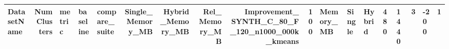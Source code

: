 \begin{tabular}{lrlllrrrrr}
\toprule
DatasetName & NumClusters & metric & baseline & compare_suite & Single_Memory_MB & Hybrid_Memory_MB & Rel_Memory_MB & Improvement_%
\midrule
SYNTH_C_80_F_120_n1000_000k_kmeans & 100 & Memory_MB & Single & Hybrid & 480 & 1440 & 3 & -200 & 1 \\
\bottomrule
\end{tabular}
